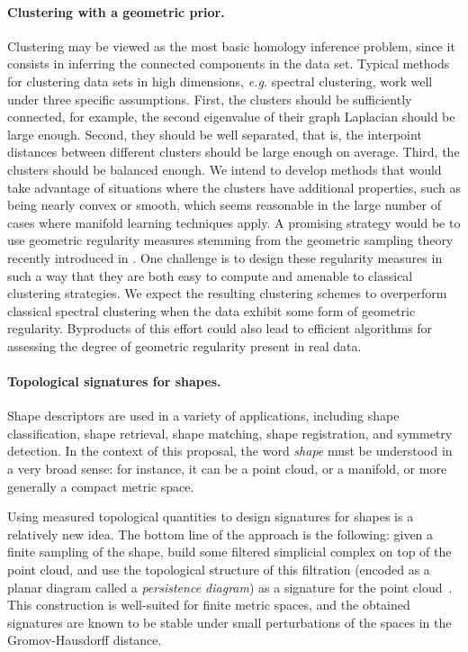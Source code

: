 \paragraph{Clustering with a geometric prior.}
Clustering may be viewed as the most basic homology inference problem, since it consists in inferring the connected components in the data set. Typical methods for clustering data sets in high dimensions, {\it e.g.} spectral clustering, work well under three specific assumptions. First, the clusters should be sufficiently connected, for example, the second eigenvalue of their graph Laplacian should be large enough. Second, they should be well separated, that is, the interpoint distances between different clusters should be large enough on average. Third, the clusters should be balanced enough. We intend to develop methods that would take advantage of situations where the clusters have additional properties, such as being nearly convex or smooth, which seems reasonable in the large number of cases where manifold learning techniques apply. A promising strategy would be to use geometric regularity measures stemming from the geometric sampling theory recently introduced in \cite{geometrica-ccl09}. One challenge is to design these regularity measures in such a way that they are both easy to compute and amenable to classical clustering strategies. We expect the resulting clustering schemes to overperform classical spectral clustering when the data exhibit some form of geometric regularity. Byproducts of this effort could also lead to efficient algorithms for assessing the degree of geometric regularity present in real data. 



\paragraph{Topological signatures for shapes.}

Shape descriptors are used in a variety of applications, including
shape classification, shape retrieval, shape matching, shape
registration, and symmetry detection. In the context of this proposal,
the word {\em shape} must be understood in a very broad sense: for
instance, it can be a point cloud, or a
manifold, or more generally a compact metric space.

Using measured topological quantities to design signatures for shapes
is a relatively new idea. The bottom line of the approach is the
following: given a finite sampling of the shape, build some filtered
simplicial complex on top of the point cloud, and use the topological
structure of this filtration (encoded as a planar diagram called a
{\em persistence diagram}) as a signature for the point
cloud~\cite{ccgmo-ghsssp-09, socg-pbsds-10}. This construction is
well-suited for finite metric spaces, and the obtained signatures are
known to be stable under small perturbations of the spaces in the
Gromov-Hausdorff distance.  

